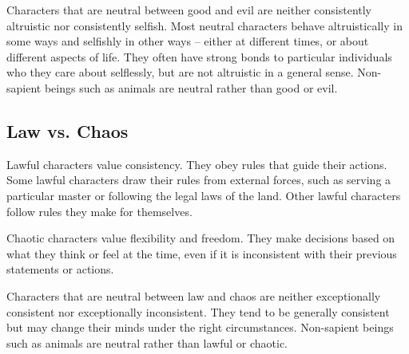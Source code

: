          Characters that are neutral between good and evil are neither consistently altruistic nor consistently selfish.
        Most neutral characters behave altruistically in some ways and selfishly in other ways -- either at different times, or about different aspects of life.
        They often have strong bonds to particular individuals who they care about selflessly, but are not altruistic in a general sense.
        Non-sapient beings such as animals are neutral rather than good or evil.

    \subsection{Law vs. Chaos}
         Lawful characters value consistency.
        They obey rules that guide their actions.
        Some lawful characters draw their rules from external forces, such as serving a particular master or following the legal laws of the land.
        Other lawful characters follow rules they make for themselves.

         Chaotic characters value flexibility and freedom.
        They make decisions based on what they think or feel at the time, even if it is inconsistent with their previous statements or actions.

         Characters that are neutral between law and chaos are neither exceptionally consistent nor exceptionally inconsistent.
        They tend to be generally consistent but may change their minds under the right circumstances.
        Non-sapient beings such as animals are neutral rather than lawful or chaotic.

